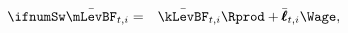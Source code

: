 \begin{eqnarray*}
\ifnumSw  \bar{\mLevBF}_{t,i} & = & \bar{\kLevBF}_{t,i}\Rprod + \bar{\mathbf{\pmb{\ell}}}_{t,i} \Wage, \label{eq:mSticky}
\end{eqnarray*}
